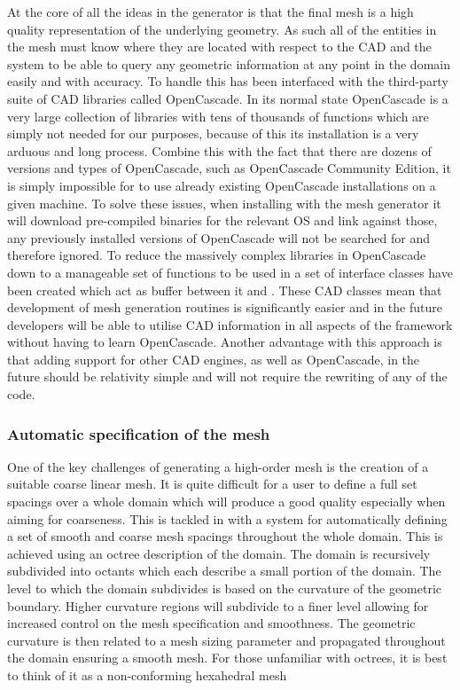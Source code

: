 At the core of all the ideas in the \mc generator is that the final mesh is a
high quality representation of the underlying geometry. As such all of the
entities in the mesh must know where they are located with respect to the CAD
and the system to be able to query any geometric information at any point in the
domain easily and with accuracy. To handle this \mc has been interfaced with the
third-party suite of CAD libraries called OpenCascade. In its normal state
OpenCascade is a very large collection of libraries with tens of thousands of
functions which are simply not needed for our purposes, because of this its
installation is a very arduous and long process. Combine this with the fact that
there are dozens of versions and types of OpenCascade, such as OpenCascade
Community Edition, it is simply impossible for \mc to use already existing
OpenCascade installations on a given machine. To solve these issues, when
installing \nekpp with the mesh generator it will download pre-compiled binaries
for the relevant OS and link against those, any previously installed versions of
OpenCascade will not be searched for and therefore ignored.
%
To reduce the massively complex libraries in OpenCascade down to a manageable
set of functions to be used in \mc a set of interface classes have been created
which act as buffer between it and \nekpp. These CAD classes mean that
development of mesh generation routines is significantly easier and in the
future \nekpp developers will be able to utilise CAD information in all aspects
of the framework without having to learn OpenCascade. Another advantage with
this approach is that adding support for other CAD engines, as well as
OpenCascade, in the future should be relativity simple and will not require the
rewriting of any of the \mc code.

\subsubsection{Automatic specification of the mesh}

One of the key challenges of generating a high-order mesh is the creation of a
suitable coarse linear mesh. It is
quite difficult for a user to define a full set spacings over a whole domain
which will produce a good quality especially when aiming for coarseness. This
is tackled in \mc with a system for automatically defining a
set of smooth and coarse mesh spacings throughout the whole domain. This is
achieved using an octree description of the domain. The domain is recursively
subdivided into octants which each describe a small portion of the domain. The
level to which the domain subdivides is based on the curvature of the geometric
boundary. Higher curvature regions will subdivide to a finer level allowing for
increased control on the mesh specification and smoothness. The geometric
curvature is then related to a mesh sizing parameter and propagated throughout
the domain ensuring a smooth mesh. For those unfamiliar with octrees, it is
best to think of it as a non-conforming hexahedral mesh

